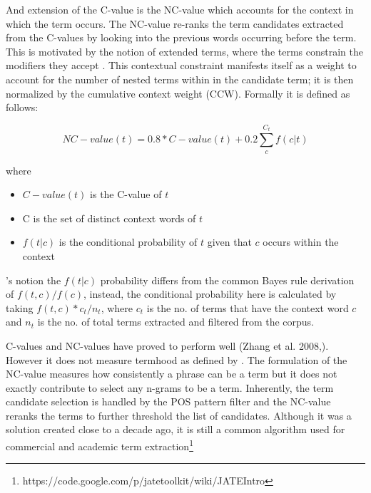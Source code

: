 And extension of the C-value is the NC-value which accounts for the context in which the term occurs. The NC-value re-ranks the term candidates extracted from the C-values by looking into the previous words occurring before the term. This is motivated by the notion of extended terms, where the terms constrain the modifiers they accept \citep{sager1980english}. This contextual constraint manifests itself as a weight to account for the number of nested terms within in the candidate term; it is then normalized by the cumulative context weight (CCW). Formally it is defined as follows:

\begin{equation}
NC-value(t)=0.8*C-value(t)+0.2\sum _{ c }^{ { C }_{ t } }{ f(c|t) } 
\end{equation}

where

\begin{itemize}[noitemsep]
\item[] $C-value(t)$ is the C-value of $t$
\item[] C is the set of distinct context words of $t$
\item[] $f(t|c)$ is the conditional probability of $t$ given that $c$ occurs within the context 
\end{itemize}

\citeauthor{frantzi2000automatic}'s \citeyear{frantzi2000automatic} notion the $f(t|c)$ probability differs from the common Bayes rule derivation of $f(t,c)/f(c)$, instead, the conditional probability here is calculated by taking $f(t,c) * c_t / n_t $, where $c_t$ is the no. of terms that have the context word $c$ and $n_t$ is the no. of total terms extracted and filtered from the corpus.

C-values and NC-values have proved to perform well \citep{zhang2008comparative,lossio2013combining} (Zhang et al. 2008,). However it does not measure termhood as defined by \cite{kageura1996}. The formulation of the NC-value measures how consistently a phrase can be a term but it does not exactly contribute to select any n-grams to be a term. Inherently, the term candidate selection is handled by the POS pattern filter and the NC-value reranks the terms to further threshold the list of candidates. Although it was a solution created close to a decade ago, it is still a common algorithm used for commercial and academic term extraction\footnote{https://code.google.com/p/jatetoolkit/wiki/JATEIntro}

